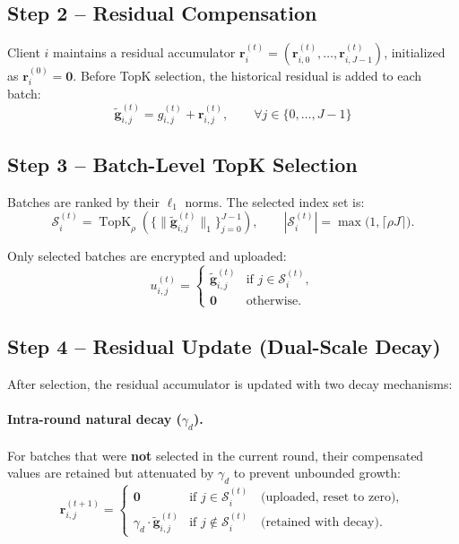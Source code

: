 \documentclass{article}
\begin{document}
\subsection*{Step 2 -- Residual Compensation}

Client $i$ maintains a residual accumulator $\mathbf{r}_i^{(t)} = (\mathbf{r}_{i,0}^{(t)}, \dots, \mathbf{r}_{i,J-1}^{(t)})$, initialized as $\mathbf{r}_i^{(0)} = \mathbf{0}$.
Before TopK selection, the historical residual is added to each batch:
%
\begin{equation}
\boxed{
\tilde{\mathbf{g}}_{i,j}^{(t)} = g_{i,j}^{(t)} + \mathbf{r}_{i,j}^{(t)}, \qquad \forall j \in \{0,\dots,J-1\}
}
\label{eq:compensate}
\end{equation}

\subsection*{Step 3 -- Batch-Level TopK Selection}

Batches are ranked by their $\ell_1$ norms. The selected index set is:
%
\begin{equation}
\mathcal{S}_i^{(t)} = \operatorname{TopK}_\rho\!\left(\bigl\{\|\tilde{\mathbf{g}}_{i,j}^{(t)}\|_1\bigr\}_{j=0}^{J-1}\right),
\qquad |\mathcal{S}_i^{(t)}| = \max\bigl(1, \lceil \rho J \rceil\bigr).
\end{equation}

Only selected batches are encrypted and uploaded:
%
\begin{equation}
u_{i,j}^{(t)} =
\begin{cases}
\tilde{\mathbf{g}}_{i,j}^{(t)} & \text{if } j \in \mathcal{S}_i^{(t)}, \\[4pt]
\mathbf{0} & \text{otherwise}.
\end{cases}
\end{equation}

\subsection*{Step 4 -- Residual Update (Dual-Scale Decay)}

After selection, the residual accumulator is updated with two decay mechanisms:

\paragraph{Intra-round natural decay ($\gamma_d$).}
For batches that were \textbf{not} selected in the current round, their compensated values are retained but attenuated by $\gamma_d$ to prevent unbounded growth:
%
\begin{equation}
\mathbf{r}_{i,j}^{(t+1)} =
\begin{cases}
\mathbf{0} & \text{if } j \in \mathcal{S}_i^{(t)} \quad \text{(uploaded, reset to zero)}, \\[6pt]
\gamma_d \cdot \tilde{\mathbf{g}}_{i,j}^{(t)} & \text{if } j \notin \mathcal{S}_i^{(t)} \quad \text{(retained with decay)}.
\end{cases}
\label{eq:residual-update}
\end{equation}
\end{document}
